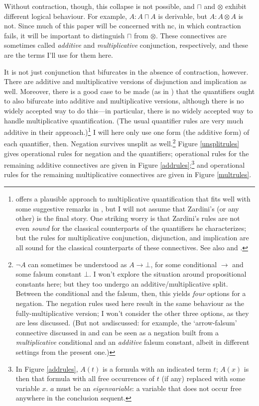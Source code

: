 \documentclass{ergoclass}
\newcommand{\sqq}[2]{\ensuremath{#1  \mathrel{:}  #2}}
\newcommand{\mand}{\ensuremath{\otimes}}
\newcommand{\aand}{\ensuremath{\sqcap}}
\newcommand{\nclog}{{\sc nc}}
\renewcommand{\cite}{\citet}						%
\begin{document}
Without contraction, though, this collapse is not possible, and $\aand$ and $\mand$ exhibit different logical behaviour. For example, $\sqq{A}{A \aand A}$ is derivable, but $\sqq{A}{A \mand A}$ is not. Since much of this paper will be concerned with \nclog, in which contraction fails, it will be important to distinguish $\aand$ from $\mand$. These connectives are sometimes called {\em additive} and {\em multiplicative} conjunction, respectively, and these are the terms I'll use for them here. 

It is not just conjunction that bifurcates in the absence of contraction, however. There are additive and multiplicative versions of disjunction and implication as well. Moreover, there is a good case to be made (as in \citealt{paoli:aq}) %
that the quantifiers ought to also bifurcate into additive and multiplicative versions, although there is no widely accepted way to do this---in particular, there is no widely accepted way to handle multiplicative quantification. (The usual quantifier rules are very much additive in their approach.)\footnote{\cite{zardini:twc} offers a plausible approach to multiplicative quantification that fits well with some suggestive remarks in \cite{paoli:aq}, but I will not assume that Zardini's (or any other) is the final story. One striking worry is that Zardini's rules are not even {\em sound} for the classical counterparts of the quantifiers he characterizes; but the rules for multiplicative conjunction, disjunction, and implication are all sound for the classical counterparts of these connectives. See also \cite{montagna:somq} and \cite{op:lbi}.} I will here only use one form (the additive form) of each quantifier, then. Negation survives unsplit as well.\footnote{$\neg A$ can sometimes be understood as $A \to \bot$, for some conditional $\to$ and some falsum constant $\bot$. I won't explore the situation around propositional constants here; but they too undergo an additive/multiplicative split. Between the conditional and the falsum, then, this yields {\em four} options for a negation. The negation rules used here result in the same behaviour as the fully-multiplicative version; I won't consider the other three options, as they are less discussed. (But not {\em un}discussed: for example, 
%
the `arrow-falsum' connective discussed in \cite{priest:ic} and \cite{beall:sot} can be seen as a negation built from a {\em multiplicative} %
%
conditional and an {\em additive} falsum constant, albeit in different settings from the present one.)} Figure \ref{unsplitrules} gives operational rules for negation and the quantifiers; operational rules for the remaining additive connectives are given in Figure \ref{addrules};\footnote{In Figure \ref{addrules}, $A(t)$ is a formula with an indicated term $t$; $A(x)$ is then that formula with all free occurrences of $t$ (if any) replaced with some variable $x$. $a$ must be an {\em eigenvariable}: a variable that does not occur free anywhere in the conclusion sequent.} and operational rules for the remaining multiplicative connectives are given in Figure \ref{multrules}.
\end{document}
